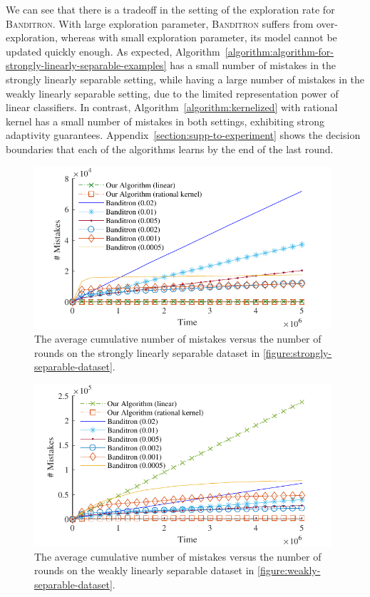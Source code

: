 We can see that there is a tradeoff in the setting of the exploration rate for
\textsc{Banditron}. With large exploration parameter, \textsc{Banditron} suffers
from over-exploration, whereas with small exploration parameter, its model
cannot be updated quickly enough. As expected,
Algorithm~\ref{algorithm:algorithm-for-strongly-linearly-separable-examples} has
a small number of mistakes in the strongly linearly separable setting, while
having a large number of mistakes in the weakly linearly separable setting, due
to the limited representation power of linear classifiers. In contrast,
Algorithm~\ref{algorithm:kernelized} with rational kernel has a small number of
mistakes in both settings, exhibiting strong adaptivity guarantees.
Appendix~\ref{section:supp-to-experiment} shows the decision boundaries that
each of the algorithms learns by the end of the last round.

\begin{minipage}{.48\textwidth}
\begin{figure}[H]
\centering
\includegraphics[width=0.98\textwidth]{figures/strong3}
\caption{The average cumulative number of mistakes versus the
number of rounds on the strongly linearly separable dataset in
\autoref{figure:strongly-separable-dataset}.}
\label{figure:number-of-mistakes-strongly-separable-dataset}
\end{figure}
\end{minipage}
\hfill
\begin{minipage}{.48\textwidth}
\begin{figure}[H]
\centering
\includegraphics[width=0.98\textwidth]{figures/weak3}
\caption{The average cumulative number of mistakes versus the
number of rounds on the weakly linearly separable dataset in
\autoref{figure:weakly-separable-dataset}.}
\label{figure:number-of-mistakes-weakly-separable-dataset}
\end{figure}
\end{minipage}

